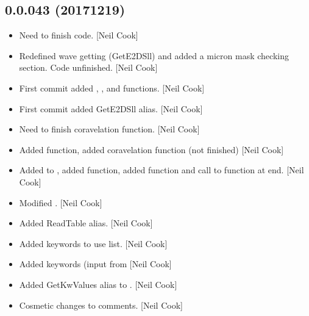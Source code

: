 \documentclass[a4paper,10pt,english]{report}
\begin{document}
\subsection{0.0.043 (2017\sphinxhyphen{}12\sphinxhyphen{}19)}
\label{\detokenize{misc/changelog:id528}}\begin{itemize}
\item {} 
Need to finish code. {[}Neil Cook{]}

\item {} 
Redefined wave getting (GetE2DSll) and added a micron mask checking
section. Code unfinished. {[}Neil Cook{]}

\item {} 
First commit added , , and
 functions. {[}Neil Cook{]}

\item {} 
First commit added GetE2DSll alias. {[}Neil Cook{]}

\item {} 
Need to finish coravelation function. {[}Neil Cook{]}

\item {} 
Added  function, added coravelation function (not
finished) {[}Neil Cook{]}

\item {} 
Added to , added  function, added 
function and call to function at end. {[}Neil Cook{]}

\item {} 
Modified . {[}Neil Cook{]}

\item {} 
Added ReadTable alias. {[}Neil Cook{]}

\item {} 
Added keywords to use list. {[}Neil Cook{]}

\item {} 
Added  keywords (input from  {[}Neil Cook{]}

\item {} 
Added GetKwValues alias to . {[}Neil Cook{]}

\item {} 
Cosmetic changes to comments. {[}Neil Cook{]}

\end{itemize}
\end{document}
